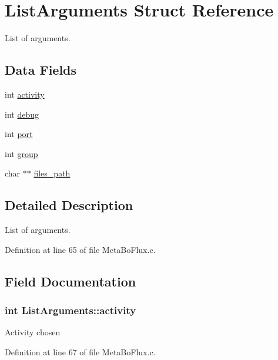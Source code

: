 \hypertarget{structListArguments}{
\section{ListArguments Struct Reference}
\label{structListArguments}
}


List of arguments.  


\subsection*{Data Fields}
\begin{DoxyCompactItemize}
\item 
int \hyperlink{structListArguments_ab970afa2b3e887fdacd7cce2b24f571c}{activity}
\item 
int \hyperlink{structListArguments_a227eea65bc99120840063486d602fcbb}{debug}
\item 
int \hyperlink{structListArguments_ae2ccfbcd131374f1eab65ddc65da7468}{port}
\item 
int \hyperlink{structListArguments_a6e6b46a5655953f6a68b5cd31da094fd}{group}
\item 
char $\ast$$\ast$ \hyperlink{structListArguments_a06c7f7a5dee18ad6974749e892e01178}{files\_\-path}
\end{DoxyCompactItemize}


\subsection{Detailed Description}
List of arguments. 

Definition at line 65 of file MetaBoFlux.c.



\subsection{Field Documentation}
\hypertarget{structListArguments_ab970afa2b3e887fdacd7cce2b24f571c}{
\subsubsection[{activity}]{\setlength{\rightskip}{0pt plus 5cm}int {\bf ListArguments::activity}}}
\label{structListArguments_ab970afa2b3e887fdacd7cce2b24f571c}
Activity chosen 

Definition at line 67 of file MetaBoFlux.c.



